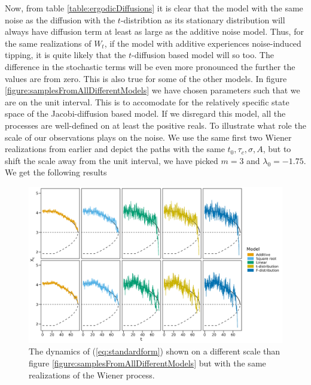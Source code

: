 Now, from table \ref{table:ergodicDiffusions} it is clear that the model with the same noise as the diffusion with the $t$-distribtion as its stationary distribution will always have diffusion term at least as large as the additive noise model. Thus, for the same realizations of $W_t$, if the model with additive experiences noise-induced tipping, it is quite likely that the $t$-diffusion based model will so too. The difference in the stochastic terms will be even more pronounced the further the values are from zero. This is also true for some of the other models. In figure \ref{figure:samplesFromAllDifferentModels} we have chosen parameters such that we are on the unit interval. This is to accomodate for the relatively specific state space of the Jacobi-diffusion based model. If we disregard this model, all the processes are well-defined on at least the positive reals. To illustrate what role the scale of our observations plays on the noise. We use the same first two Wiener realizations from earlier and depict the paths with the same $t_0, \tau_c, \sigma, A$, but to shift the scale away from the unit interval, we have picked $m = 3$ and $\lambda_0 = -1.75$. We get the following results
\begin{figure}[h]
    \begin{center}
        \includegraphics[scale = .1]{figures/sample_paths_plot_big_scale.jpeg}
        \caption{The dynamics of (\ref{eq:standardform}) shown on a different scale than figure \ref{figure:samplesFromAllDifferentModels} but with the same realizations of the Wiener process.}
        \label{figure:samplesFromFiveDifferentModels}
    \end{center}
\end{figure}\\

